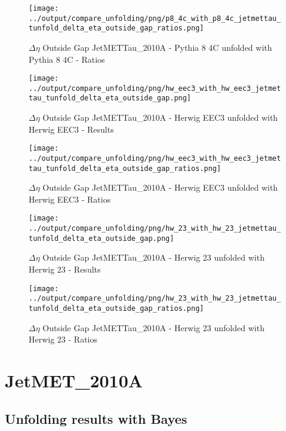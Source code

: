 \documentclass[11pt]{book}
\begin{document}
\begin{figure}[ht]
\centering
\texttt{[image: ../output/compare\_unfolding/png/p8\_4c\_with\_p8\_4c\_jetmettau\_tunfold\_delta\_eta\_outside\_gap\_ratios.png]}
\caption{$\Delta\eta$ Outside Gap JetMETTau\_2010A - Pythia 8 4C unfolded with Pythia 8 4C - Ratios}
\label{p8_p8_jetmettau_tunfold_delta_eta_outside_gap_b}
\end{figure}

\begin{figure}[ht]
\centering
\texttt{[image: ../output/compare\_unfolding/png/hw\_eec3\_with\_hw\_eec3\_jetmettau\_tunfold\_delta\_eta\_outside\_gap.png]}
\caption{$\Delta\eta$ Outside Gap JetMETTau\_2010A - Herwig EEC3 unfolded with Herwig EEC3 - Results}
\label{hw_eec3_hw_eec3_jetmettau_tunfold_delta_eta_outside_gap_a}
\end{figure}

\begin{figure}[ht]
\centering
\texttt{[image: ../output/compare\_unfolding/png/hw\_eec3\_with\_hw\_eec3\_jetmettau\_tunfold\_delta\_eta\_outside\_gap\_ratios.png]}
\caption{$\Delta\eta$ Outside Gap JetMETTau\_2010A - Herwig EEC3 unfolded with Herwig EEC3 - Ratios}
\label{hw_eec3_hw_eec3_jetmettau_tunfold_delta_eta_outside_gap_b}
\end{figure}

\begin{figure}[ht]
\centering
\texttt{[image: ../output/compare\_unfolding/png/hw\_23\_with\_hw\_23\_jetmettau\_tunfold\_delta\_eta\_outside\_gap.png]}
\caption{$\Delta\eta$ Outside Gap JetMETTau\_2010A - Herwig 23 unfolded with Herwig 23 - Results}
\label{hw_23_hw_23_jetmettau_tunfold_delta_eta_outside_gap_a}
\end{figure}

\begin{figure}[ht]
\centering
\texttt{[image: ../output/compare\_unfolding/png/hw\_23\_with\_hw\_23\_jetmettau\_tunfold\_delta\_eta\_outside\_gap\_ratios.png]}
\caption{$\Delta\eta$ Outside Gap JetMETTau\_2010A - Herwig 23 unfolded with Herwig 23 - Ratios}
\label{hw_23_hw_23_jetmettau_tunfold_delta_eta_outside_gap_b}
\end{figure}


\clearpage
\section{JetMET\_2010A}
\subsection{Unfolding results with Bayes}
\end{document}
